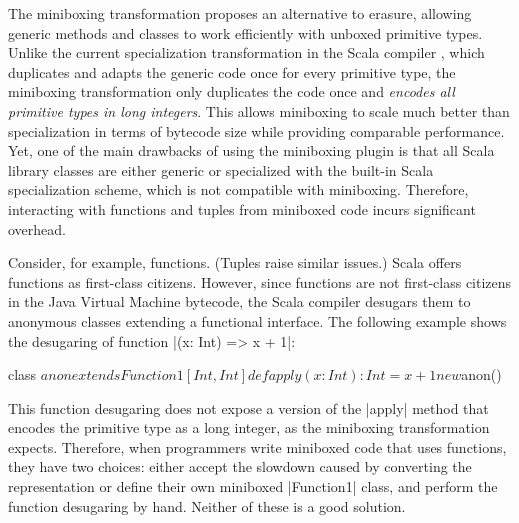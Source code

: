 
The miniboxing transformation \cite{miniboxing} proposes an alternative to erasure, allowing generic methods and classes to work efficiently with unboxed primitive types. Unlike the current specialization transformation in the Scala compiler \cite{iuli-thesis}, which duplicates and adapts the generic code once for every primitive type, the miniboxing transformation only duplicates the code once and \emph{encodes all primitive types in long integers}. This allows miniboxing to scale much better than specialization \cite{miniboxing-linkedlist} in terms of bytecode size while providing comparable performance. Yet, one of the main drawbacks of using the miniboxing plugin is that all Scala library classes are either generic or specialized with the built-in Scala specialization scheme, which is not compatible with miniboxing. Therefore, interacting with functions and tuples from miniboxed code incurs significant overhead.

Consider, for example, functions. (Tuples raise similar issues.) Scala offers functions as first-class citizens. However, since functions are not first-class citizens in the Java Virtual Machine bytecode, the Scala compiler desugars them to anonymous classes extending a functional interface. The following example shows the desugaring of function |(x: Int) => x + 1|:

\begin{lstlisting-nobreak}
class $anon extends Function1[Int, Int] {
  def apply(x: Int): Int = x + 1
}
new $anon()
\end{lstlisting-nobreak}

This function desugaring does not expose a version of the |apply| method that encodes the primitive type as a long integer, as the miniboxing transformation expects. Therefore, when programmers write miniboxed code that uses functions, they have two choices: either accept the slowdown caused by converting the representation or define their own miniboxed |Function1| class, and perform the function desugaring by hand. Neither of these is a good solution.

